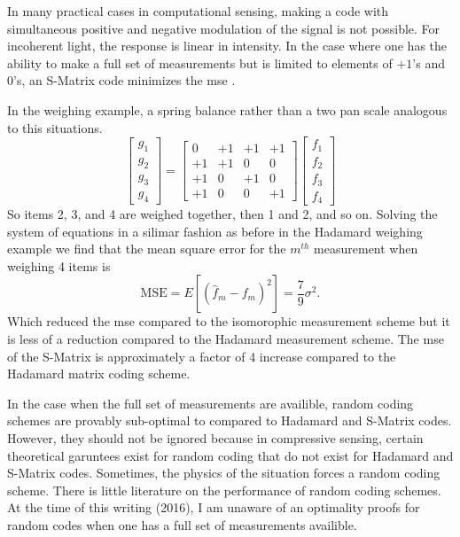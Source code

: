In many practical cases in computational sensing, making a code with simultaneous positive and negative modulation of the signal is not possible. For incoherent light, the response is linear in intensity. In the case where one has the ability to make a full set of measurements but is limited to elements of $+1$'s and $0$'s, an S-Matrix code minimizes the \gls{mse} \cite{harwit2012hadamard}.

In the weighing example, a spring balance rather than a two pan scale analogous to this situations. 
\begin{equation}
\left[ \begin{matrix} g_{1}\\ g_{2}\\ g_{3}\\ g_{4}\end{matrix} \right] = 
\left[ \begin{matrix} 0 & +1 & +1 & +1 \\ +1 & +1 & 0 & 0 \\ +1 & 0 & +1 & 0 \\ +1 & 0 & 0 & +1 \end{matrix} \right]
\left[ \begin{matrix} f_{1}\\ f_{2}\\ f_{3}\\ f_{4}\end{matrix} \right]
\end{equation}
So items 2, 3, and 4 are weighed together, then 1 and 2, and so on. Solving the system of equations in a silimar fashion as before in the Hadamard weighing example we find that the mean square error for the $m^{th}$ measurement when weighing 4 items is 
\begin{equation}
\text{MSE} = E [ ( \hat{f}_{m} - {f}_{m} )^2 ] = \frac{7}{9} \sigma^2.
\end{equation}
Which reduced the \gls{mse} compared to the isomorophic measurement scheme but it is less of a reduction compared to the Hadamard measurement scheme. The \gls{mse} of the S-Matrix is approximately a factor of 4 increase compared to the Hadamard matrix coding scheme. 

In the case when the full set of measurements are availible, random coding schemes are provably sub-optimal to compared to Hadamard and S-Matrix codes. However, they should not be ignored because in compressive sensing, certain theoretical garuntees exist for random coding that do not exist for Hadamard and S-Matrix codes. Sometimes, the physics of the situation forces a random coding scheme. There is little literature on the performance of random coding schemes. At the time of this writing (2016), I am unaware of an optimality proofs for random codes when one has a full set of measurements availible. 


